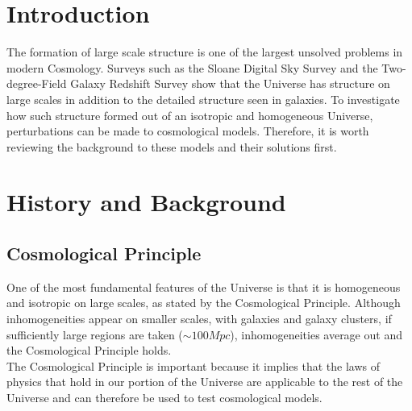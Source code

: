 \documentclass[12pt]{article} %
\begin{document}
\tableofcontents %

\newpage %


\section{Introduction} %

The formation of large scale structure is one of the largest unsolved problems in modern Cosmology. Surveys such as the Sloane Digital Sky Survey and the Two-degree-Field Galaxy Redshift Survey show that the Universe has structure on large scales in addition to the detailed structure seen in galaxies. To investigate how such structure formed out of an isotropic and homogeneous Universe, perturbations can be made to cosmological models. Therefore, it is worth reviewing the background to these models and their solutions first.


\section{History and Background}

\subsection{Cosmological Principle}

One of the most fundamental features of the Universe is that it is homogeneous and isotropic on large scales, as stated by the Cosmological Principle\cite{coles}. Although inhomogeneities appear on smaller scales, with galaxies and galaxy clusters, if sufficiently large regions are taken ($\sim 100 Mpc$)\cite{mukhanov}, inhomogeneities average out and the Cosmological Principle holds. \\

The Cosmological Principle is important because it implies that the laws of physics that hold in our portion of the Universe are applicable to the rest of the Universe and can therefore be used to test cosmological models.\\
\end{document}
